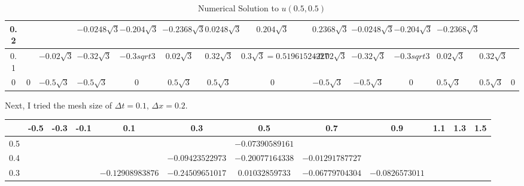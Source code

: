\begin{answer}
\begin{table}[H]
\begin{adjustbox}{width=\columnwidth,center}
\begin{tabular}{|c|l|l|l|c|c|c|c|c|c|c|l|l|l|}
0.2       &                        &                                      & $-0.0248\sqrt{3}$                    & $-0.204\sqrt{3}$    & $-0.2368\sqrt{3}$     & $0.0248\sqrt{3}$     & $0.204\sqrt{3}$      & $0.2368\sqrt{3}$     & $-0.0248\sqrt{3}$     & $-0.204\sqrt{3}$    & $-0.2368\sqrt{3}$ &                &     \\ \hline
0.1       &                        & \multicolumn{1}{c|}{$-0.02\sqrt{3}$} & \multicolumn{1}{c|}{$-0.32\sqrt{3}$} & $-0.3sqrt{3}$       & $0.02\sqrt{3}$        & $0.32\sqrt{3}$       & $0.3\sqrt{3}=0.51961524227$        & $-0.02\sqrt{3}$      & $-0.32\sqrt{3}$       & $-0.3sqrt{3}$       & $0.02\sqrt{3}$    & $0.32\sqrt{3}$ &     \\ \hline
0         & \multicolumn{1}{c|}{0} & $-0.5\sqrt{3}$                       & $-0.5\sqrt{3}$                       & 0                   & $0.5\sqrt{3}$         & $0.5\sqrt{3}$        & 0                    & $-0.5\sqrt{3}$       & $-0.5\sqrt{3}$        & 0                   & $0.5\sqrt{3}$     & $0.5\sqrt{3}$  & 0   \\ \hline
\end{tabular}
\end{adjustbox}
\caption{Numerical Solution to $u(0.5,0.5)$}
\label{tab:tab1}
\end{table}
Next, I tried the mesh size of $\Delta t = 0.1, \, \Delta x =0.2$.
\begin{table}[H]
\centering
\begin{adjustbox}{width=\columnwidth,center}
\begin{tabular}{|c|c|c|c|c|c|c|c|c|c|c|c|}
\hline
\textbf{} & -0.5 & -0.3             & -0.1             & 0.1             & 0.3             & 0.5              & 0.7              & 0.9              & 1.1              & 1.3             & 1.5 \\ \hline
0.5       &      &                  &                  &                 &                 & $-0.07390589161$   &                  &                  &                  &                 &     \\ \hline
0.4       &      &                  &                  &                 & $-0.09423522973$  & $-0.20077164338$   & $-0.01291787727$   &                  &                  &                 &     \\ \hline
0.3       &      &                  &                  & $-0.12908983876$  & $-0.24509651017$  & $0.01032859733$    & $-0.06779704304$   & $-0.0826573011$    &                  &                 &     \\ \hline

\end{tabular}
\end{adjustbox}
\end{table}
\end{answer}
